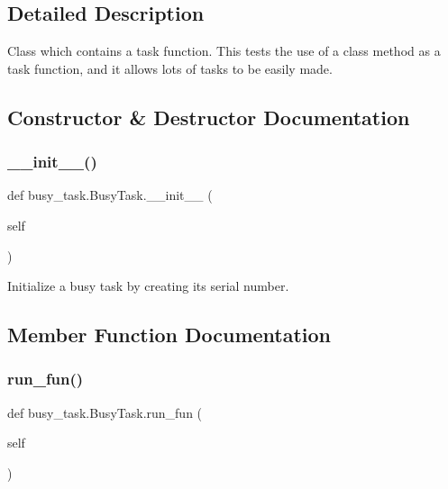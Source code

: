 \subsection{Detailed Description}
\begin{DoxyVerb}Class which contains a task function. This tests the use of a class
method as a task function, and it allows lots of tasks to be easily made.
\end{DoxyVerb}
 

\subsection{Constructor \& Destructor Documentation}
\mbox{\label{classbusy__task_1_1_busy_task_a091266e3c8c477e726f8dadc7c559bc0}} 
\subsubsection{\texorpdfstring{\_\_init\_\_()}{\_\_init\_\_()}}
{\footnotesize\ttfamily def busy\+\_\+task.\+Busy\+Task.\+\_\+\+\_\+init\+\_\+\+\_\+ (\begin{DoxyParamCaption}\item[{}]{self }\end{DoxyParamCaption})}

\begin{DoxyVerb}Initialize a busy task by creating its serial number. \end{DoxyVerb}
 

\subsection{Member Function Documentation}
\mbox{\label{classbusy__task_1_1_busy_task_a59bba8eef73ceb08cbf6969b7e18ffba}} 
\subsubsection{\texorpdfstring{run\_fun()}{run\_fun()}}
{\footnotesize\ttfamily def busy\+\_\+task.\+Busy\+Task.\+run\+\_\+fun (\begin{DoxyParamCaption}\item[{}]{self }\end{DoxyParamCaption})}

